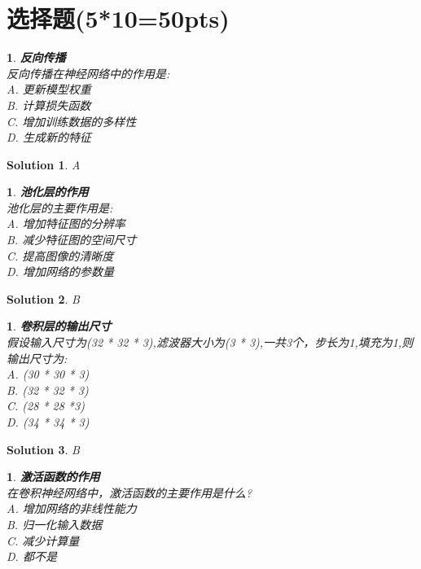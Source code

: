\documentclass{article}
\title{\Huge\Assignment}
\author{\ID \Name \quad\href{mailto:tianym2022@smail.nju.edu.cn}{\color{magenta}\Email}}
\date{\today}
\theoremstyle{Problem}
\newtheorem{prob}[subsection]{}
\theoremstyle{Solution}
\newtheorem*{sol}{Solution}
\begin{document}
	\maketitle
	
	\section{选择题(5*10=50pts)}
	\begin{prob}
		\textbf{反向传播}\\
		反向传播在神经网络中的作用是:\\
		A. 更新模型权重\\
		B. 计算损失函数\\
		C. 增加训练数据的多样性\\
		D. 生成新的特征
	\end{prob}
	
	\begin{sol}
		A\\
	\end{sol}
	
	\begin{prob}
		\textbf{池化层的作用}\\
		池化层的主要作用是:\\
		A. 增加特征图的分辨率 \\
		B. 减少特征图的空间尺寸 \\
		C. 提高图像的清晰度 \\
		D. 增加网络的参数量
	\end{prob}
	
	\begin{sol}
		B\\
	\end{sol}
	
	\begin{prob}
		\textbf{卷积层的输出尺寸}\\
		假设输入尺寸为(32 * 32 * 3),滤波器大小为(3 * 3),一共3个，步长为1,填充为1,则输出尺寸为:\\
		A. (30 * 30 * 3)\\ 
		B. (32 * 32 * 3) \\
		C. (28 * 28 *3) \\
		D. (34 * 34 * 3)
	\end{prob}
	
	\begin{sol}
		B\\
	\end{sol}
	
	\begin{prob}
		\textbf{激活函数的作用}\\
		在卷积神经网络中，激活函数的主要作用是什么?\\
		A. 增加网络的非线性能力\\ 
		B. 归一化输入数据 \\
		C. 减少计算量 \\
		D. 都不是
	\end{prob}
	
\end{document}
